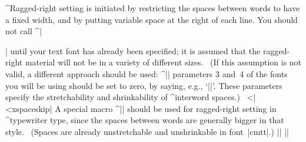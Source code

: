 {{^{Ragged-right setting} is initiated by restricting the spaces between
words to have a fixed width, and by putting variable space at the right
of each line. You should not call ^|\raggedright| until your text font
has already been specified; it is assumed that the ragged-right material
will not be in a variety of different sizes. \ (If this assumption is
not valid, a different approach should be used: ^|\fontdimen| parameters
3 and~4 of the fonts you will be using should be set to zero, by saying,
e.g., `|\tenrm=0pt|'. These parameters specify the stretchability
and shrinkability of ^{interword spaces}.) \ ^^|\spaceskip| ^^|xspaceskip|
A special macro ^|\ttraggedright| should be used for ragged-right setting
in ^{typewriter type}, since the spaces between words are generally
bigger in that style. \ (Spaces are already unstretchable and
unshrinkable in font~|cmtt|.)
\beginlines
|\def\raggedright{\rightskip=0pt plus2em|\parbreak%
|  \spaceskip=.3333em \xspaceskip=.5em\relax}|
|\def\ttraggedright{\tt\rightskip=0pt plus2em\relax}|
\endlines

}}
